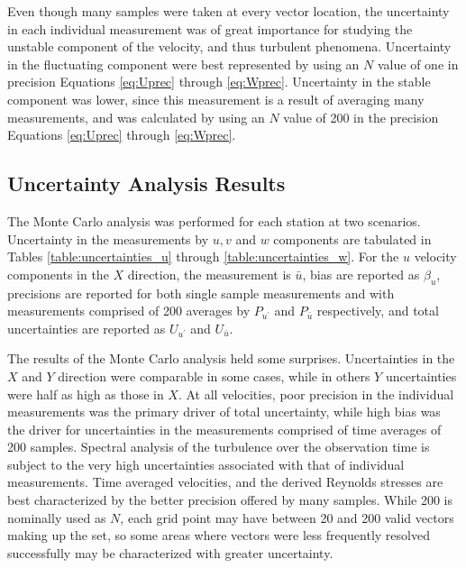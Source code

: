 

Even though many samples were taken at every vector location, the uncertainty 
in each individual measurement was of great importance for studying the 
unstable component of the velocity, and thus turbulent phenomena. Uncertainty 
in the fluctuating component were best represented by using an $N$ 
value of one in precision Equations \ref{eq:Uprec} through \ref{eq:Wprec}. 
Uncertainty in the stable component was lower, since this measurement is a 
result of averaging many measurements, and was calculated by using an $N$ value 
of 200 in the precision Equations \ref{eq:Uprec} through \ref{eq:Wprec}.


\subsection{Uncertainty Analysis Results}
The Monte Carlo analysis was performed for each station at two scenarios. 
Uncertainty in the measurements by $u, v$ and $w$ 
components are tabulated in Tables \ref{table:uncertainties_u} through 
\ref{table:uncertainties_w}. For the $u$ velocity components in the $X$ 
direction, the measurement is $\bar{u}$, bias are reported as $\beta_u$, 
precisions are reported for both single sample measurements and with 
measurements comprised of 200 averages by $P_{u^\prime}$ and $P_{\bar{u}}$ 
respectively, and total uncertainties are reported as $U_{u^\prime}$ and 
$U_{\bar{u}}$. 





The results of the Monte Carlo analysis held some surprises. Uncertainties in 
the $X$ and $Y$ direction were comparable in some cases, while in others $Y$ 
uncertainties were half as high as those in $X$. At all velocities, poor 
precision in the individual measurements was the primary driver of total 
uncertainty, while high bias was the driver for uncertainties in the 
measurements comprised of time averages of 200 samples. Spectral analysis of 
the turbulence over the observation time is subject to the very high 
uncertainties associated with that of individual measurements. Time averaged 
velocities, and the derived Reynolds stresses are best characterized by the 
better precision offered by many samples. While 200 is nominally used as $N$, 
each grid point may have between 20 and 200 valid vectors making up the set, so 
some areas where vectors were less frequently resolved successfully may be 
characterized with greater uncertainty.

